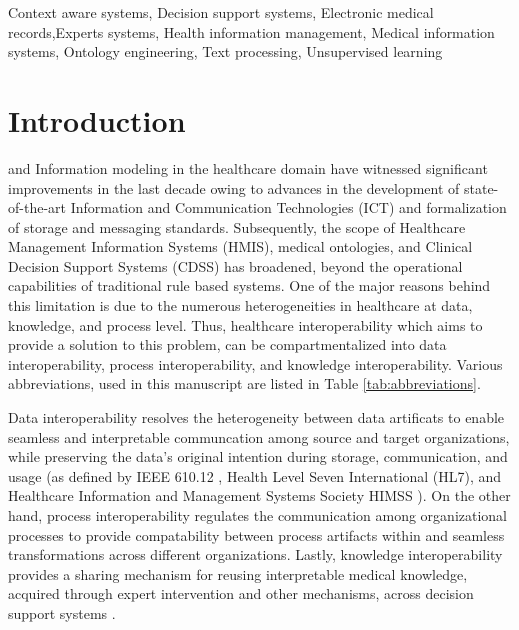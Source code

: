 \documentclass{ieeeaccess}
\begin{document}
\begin{keywords}
Context aware systems, Decision support systems, Electronic medical records,Experts systems,   Health information management, Medical information systems, Ontology engineering, Text processing, Unsupervised learning
\end{keywords}

\titlepgskip=-15pt

\maketitle

\section{Introduction}
\label{intro}
 and Information modeling in the healthcare domain have witnessed significant improvements in the last decade owing to advances in the development of state-of-the-art Information and Communication Technologies (ICT) and formalization of storage and messaging standards. Subsequently, the scope of Healthcare Management Information Systems (HMIS), medical ontologies, and Clinical Decision Support Systems (CDSS) has broadened, beyond the operational capabilities of traditional rule based systems. One of the major reasons behind this limitation is due to the numerous heterogeneities in healthcare at data, knowledge, and process level. Thus, healthcare interoperability which aims to provide a solution to this problem, can be compartmentalized into data interoperability, process interoperability, and knowledge interoperability. Various abbreviations, used in this manuscript are listed in Table \ref{tab:abbreviations}.

Data interoperability resolves the heterogeneity between data artificats to enable seamless and interpretable communcation among source and target organizations, while preserving the data's original intention during storage, communication, and usage (as defined by IEEE 610.12 \cite{geraci1991ieee}, Health Level Seven International (HL7), and Healthcare Information and Management Systems Society HIMSS \cite{Himss_url2013}).
On the other hand, process interoperability regulates the communication among organizational processes to provide compatability between process artifacts within and seamless transformations across different organizations\cite{khan2013process}. Lastly, knowledge interoperability provides a sharing mechanism for reusing interpretable medical knowledge, acquired through expert intervention and other mechanisms, across decision support systems \cite{ali2017multi}.
\end{document}
